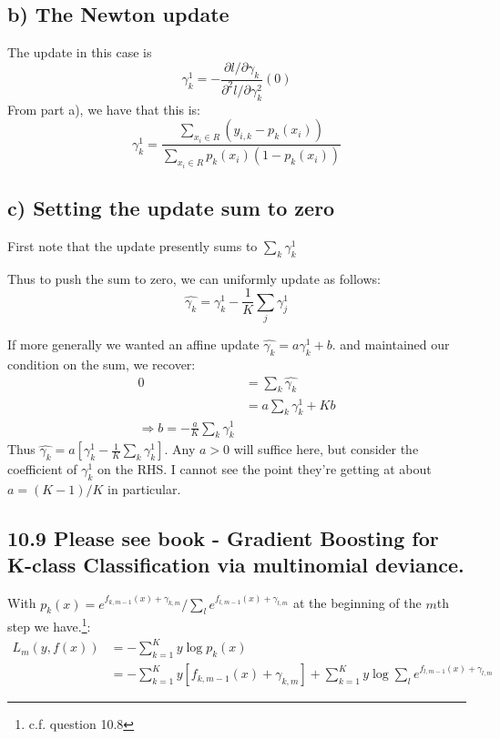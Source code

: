 \subsection*{b) The Newton update}
The update in this case is $$\gamma_k^{1} = -\frac{\partial l / \partial \gamma_k }{{\partial^2 l / \partial \gamma_k^2 }} (0)$$
From part a), we have that this is:
$$\gamma_k^{1} = \frac{\sum_{x_i \in R} (y_{i,k} - p_k(x_i))}{\sum_{x_i \in R} p_k(x_i) (1 - p_k(x_i))}$$


\subsection*{c) Setting the update sum to zero}

First note that the update presently sums to $\sum_k \gamma_k^1$

Thus to push the sum to zero, we can uniformly update as follows:
$$ \hat{\gamma_k} = \gamma_k^1 - \frac{1}{K} \sum_j \gamma_j^1 $$

If more generally we wanted an affine update $ \hat{\gamma_k} = a \gamma_k^1 + b$. and maintained our condition on the sum, we recover:
\begin{align*}
    0 &= \sum_k \hat{\gamma_k} \\
    &= a \sum_k \gamma_k^1 + K b \\
\Rightarrow b = -\frac{a}{K} \sum_k \gamma_k^1
\end{align*}
Thus $\hat{\gamma_k} = a \left[\gamma_k^1 - \frac{1}{K} \sum_k \gamma_k^1 \right]$. Any $a > 0$ will suffice here, but consider the coefficient of $\gamma_{k}^1$ on the RHS. I cannot see the point they're getting at about $a = (K-1) / K$ in particular.

\subsection*{10.9 Please see book - Gradient Boosting for K-class Classification via multinomial deviance.}

With $p_k(x) = e^{f_{k, m-1}(x) + \gamma_{k,m}} / \sum_l e^{f_{l,m-1}(x) + \gamma_{l,m}}$ at the beginning of the $m$th step we have.\footnote{c.f. question 10.8}:
\begin{align*}
    L_m(y, f(x)) &= -\sum_{k=1}^{K} y \log p_k(x) \\
    &= -\sum_{k=1}^{K} y \left[f_{k, m-1}(x) + \gamma_{k,m}\right] +
    \sum_{k=1}^{K} y \log \sum_l e^{f_{l,m-1}(x) + \gamma_{l,m}}
\end{align*} 


